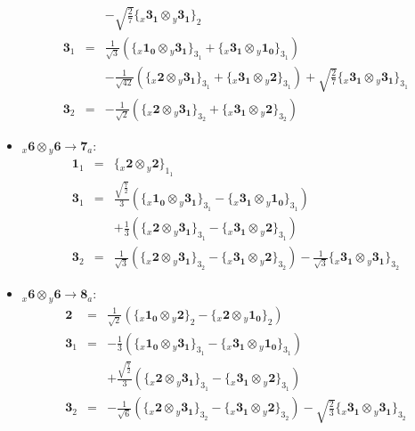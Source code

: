 \documentclass[english]{article}
\newcommand{\rep}[1]{\mathbf{#1}}
\newcommand{\repx}[2]{{}_{#2}\mathbf{#1}}
\newcommand{\subcg}[3]{\big\{ \repx{#1}{x}\otimes\repx{#2}{y}\big\}^{}_{#3}}
\begin{document}
\begin{itemize}
\begin{eqnarray*}
 & & -\sqrt{\frac{2}{7}}\subcg{3_{1}}{3_{1}}{2}
\\
\rep{3}_{1} &=& \frac{1}{\sqrt{3}}\left(\subcg{1_{0}}{3_{1}}{3_{1}}+\subcg{3_{1}}{1_{0}}{3_{1}}\right) \\ 
 & & -\frac{1}{\sqrt{42}}\left(\subcg{2}{3_{1}}{3_{1}}+\subcg{3_{1}}{2}{3_{1}}\right)+\sqrt{\frac{2}{7}}\subcg{3_{1}}{3_{1}}{3_{1}}
\\
\rep{3}_{2} &=& -\frac{1}{\sqrt{2}}\left(\subcg{2}{3_{1}}{3_{2}}+\subcg{3_{1}}{2}{3_{2}}\right)
\end{eqnarray*}
\item $\repx{6}{x}\otimes\repx{6}{y}\to\rep{7}_{a}$:
\begin{eqnarray*}
\rep{1}_{1} &=& \subcg{2}{2}{1_{1}}
\\
\rep{3}_{1} &=& \frac{\sqrt{\frac{7}{2}}}{3}\left(\subcg{1_{0}}{3_{1}}{3_{1}}-\subcg{3_{1}}{1_{0}}{3_{1}}\right) \\ 
 & & +\frac{1}{3}\left(\subcg{2}{3_{1}}{3_{1}}-\subcg{3_{1}}{2}{3_{1}}\right)
\\
\rep{3}_{2} &=& \frac{1}{\sqrt{3}}\left(\subcg{2}{3_{1}}{3_{2}}-\subcg{3_{1}}{2}{3_{2}}\right)-\frac{1}{\sqrt{3}}\subcg{3_{1}}{3_{1}}{3_{2}}
\end{eqnarray*}
\item $\repx{6}{x}\otimes\repx{6}{y}\to\rep{8}_{a}$:
\begin{eqnarray*}
\rep{2} &=& \frac{1}{\sqrt{2}}\left(\subcg{1_{0}}{2}{2}-\subcg{2}{1_{0}}{2}\right)
\\
\rep{3}_{1} &=& -\frac{1}{3}\left(\subcg{1_{0}}{3_{1}}{3_{1}}-\subcg{3_{1}}{1_{0}}{3_{1}}\right) \\ 
 & & +\frac{\sqrt{\frac{7}{2}}}{3}\left(\subcg{2}{3_{1}}{3_{1}}-\subcg{3_{1}}{2}{3_{1}}\right)
\\
\rep{3}_{2} &=& -\frac{1}{\sqrt{6}}\left(\subcg{2}{3_{1}}{3_{2}}-\subcg{3_{1}}{2}{3_{2}}\right)-\sqrt{\frac{2}{3}}\subcg{3_{1}}{3_{1}}{3_{2}}
\end{eqnarray*}
\end{itemize}
\end{document}
